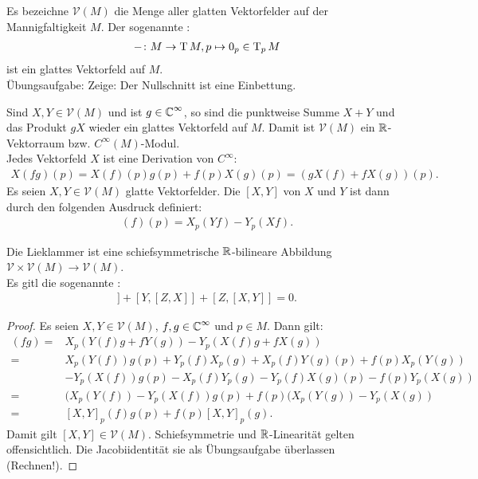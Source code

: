\begin{bem*}
  Es bezeichne $\mathcal V(M)$ die Menge aller glatten Vektorfelder auf der Mannigfaltigkeit $M$. Der sogenannte :
  \begin{align*}
    - \colon M \to \operatorname{T} M, p \mapsto 0_p \in \operatorname{T}_pM
  \end{align*}
  ist ein glattes Vektorfeld auf $M$.\\

  Übungsaufgabe: Zeige: Der Nullschnitt ist eine Einbettung.
\end{bem*}

\begin{bem*}
  Sind $X,Y \in \mathcal V(M)$ und ist $g \in \operatorname{\mathbb{C}}^{\infty}$, so sind die punktweise Summe $X+Y$ und das Produkt $gX$ wieder ein glattes Vektorfeld auf $M$.
  Damit ist $\mathcal V(M)$ ein $\operatorname{\mathbb{R}}$-Vektorraum bzw. $C^{\infty}(M)$-Modul.\\

  Jedes Vektorfeld $X$ ist eine Derivation von $C^{\infty}$:
  \begin{align*}
    X(fg)(p) = X(f)(p)g(p) + f(p) X(g)(p) = \left(gX(f) + fX(g)\right)(p).
  \end{align*}
  Es seien $X,Y \in \mathcal V(M)$ glatte Vektorfelder. Die  $[X,Y]$ von $X$ und $Y$ ist dann durch den folgenden Ausdruck definiert:
  \begin{align*}
    [X,Y](f)(p) = X_p(Yf)-Y_p(Xf).
  \end{align*}
\end{bem*}

\begin{lemma}
  Die Lieklammer ist eine schiefsymmetrische $\operatorname{\mathbb{R}}$-bilineare Abbildung $\mathcal V \times \mathcal V(M) \to \mathcal V(M)$.\\
  Es gitl die sogenannte :
  \begin{align*}
    [X,[Y,z]] + [Y,[Z,X]] + [Z,[X,Y]] = 0.
  \end{align*}
\end{lemma}

\begin{proof}
  Es seien $X,Y \in \mathcal V(M)$, $f,g \in \operatorname{\mathbb{C}}^{\infty}$ und $p \in M$. Dann gilt:
  \begin{align*}
    [X,Y](fg)  = & X_p(Y(f)g + fY(g)) - Y_p(X(f)g+fX(g))\\
    = & X_p(Y(f))g(p) + Y_p(f)X_p(g) + X_p(f)Y(g)(p) + f(p)X_p(Y(g))\\
    & - Y_p(X(f))g(p) - X_p(f)Y_p(g) - Y_p(f)X(g)(p)-f(p)Y_p(X(g))\\
    = & (X_p(Y(f))-Y_p(X(f))g(p) + f(p)(X_p(Y(g))-Y_p(X(g))\\
    = & [X,Y]_p (f)g(p) + f(p)[X,Y]_p(g).
  \end{align*}
  Damit gilt $[X,Y] \in \mathcal V(M)$. Schiefsymmetrie und $\operatorname{\mathbb{R}}$-Linearität gelten offensichtlich. Die Jacobiidentität sie als Übungsaufgabe überlassen (Rechnen!).
\end{proof}


